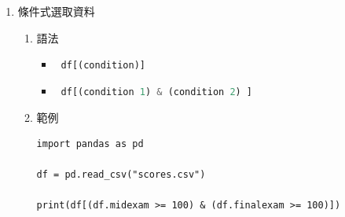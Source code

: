 \documentclass[a4paper,12pt]{article}
\begin{document}
\begin{enumerate}
\begin{lstlisting}
df = pd.read_csv("scores.csv")

print(df[1:3])
print(df[df.homework<30])
# 合併row and column
print(df.id[df.homework<30])
print(df[['id', 'homework']][1:3])
\end{lstlisting}

\begin{verbatim}
          id  classparti  typing  homework  midexam  finalexam
1  201910902          96      56     93.42     60.0       40.0
2  201910903          96      76    102.63     45.0       28.0
            id  classparti  typing  homework  midexam  finalexam
10   201910911          62      44     20.39      4.0        0.0
18   201910919          14      56     25.92      0.0        0.0
23   201910924          75      48     10.75      0.0        0.0
124  201911315          71     120     15.35      0.0        0.0
140  201911331          93     120     25.88      0.0       16.0
10     201910911
18     201910919
23     201910924
124    201911315
140    201911331
Name: id, dtype: int64
          id  homework
1  201910902     93.42
2  201910903    102.63
\end{verbatim}

\item 條件式選取資料
\label{sec:org15f64f6}
\begin{enumerate}
\item 語法
\label{sec:orgb3d1e61}
\begin{itemize}
\item \lstinline[breaklines=true,language=Python]~ df[(condition)] ~\\
\item \lstinline[breaklines=true,language=Python]~ df[(condition 1) & (condition 2) ] ~\\
\end{itemize}
\item 範例
\label{sec:org0954901}
\lstset{breaklines=true,language=Python,label= ,caption= ,captionpos=b,firstnumber=1,numbers=left}
\begin{lstlisting}
import pandas as pd

df = pd.read_csv("scores.csv")

print(df[(df.midexam >= 100) & (df.finalexam >= 100)])
\end{lstlisting}


\end{enumerate}
\end{enumerate}
\end{document}
